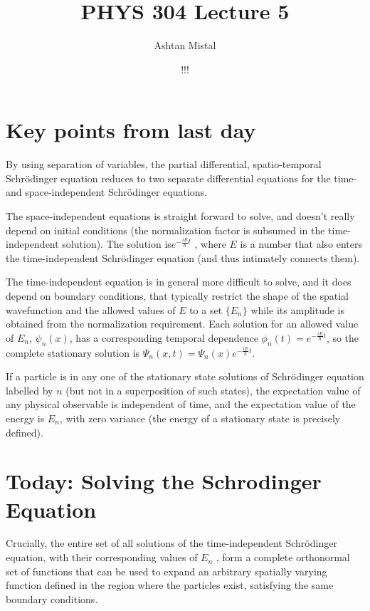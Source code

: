 \documentclass{article}
\title{PHYS 304 Lecture 5}
\author{Ashtan Mistal}
\date{!!!}
\begin{document}
\ifstandalone
\maketitle
\fi

\graphicspath{{./Lecture05/}}

\section{Key points from last day}

By using separation of variables, the partial differential, spatio-temporal Schrödinger equation reduces to two separate differential equations for the time- and space-independent Schrödinger equations.


The space-independent equations is straight forward to solve, and doesn't really depend on initial conditions (the normalization factor is subsumed in the time-independent solution).  The solution is$e^{- \frac{i E}{\hbar} t}$ , where $E$ is a number that also enters the time-independent Schrödinger equation (and thus intimately connects them).

The time-independent equation is in general more difficult to solve, and it does depend on boundary conditions, that typically restrict the shape of the spatial wavefunction and the allowed values of $E$ to a set  $\{ E_n\}$ while its amplitude is obtained from the normalization requirement.  Each solution for an allowed value of $E_n$, $\psi_n(x)$, has a corresponding temporal dependence $\phi_n(t) = e^{- \frac{i E}{\hbar} t}$, so the complete stationary solution is $\Psi_n(x,t) = \Psi_n(x) e^{- \frac{i E}{\hbar} t}$. 

If a particle is in any one of the stationary state solutions of Schrödinger equation labelled by $n$ (but not in a superposition of such states), the expectation value of any physical observable is independent of time, and the expectation value of the energy is $E_n$, with zero variance (the energy of a stationary state is precisely defined).


\section{Today: Solving the Schrodinger Equation}

Crucially, the entire set of all solutions of the time-independent Schrödinger equation, with their corresponding values of $E_n$ , form a complete orthonormal set of functions that can be used to expand an arbitrary spatially varying function defined in the region where the particles exist, satisfying the same boundary conditions.   
\end{document}
